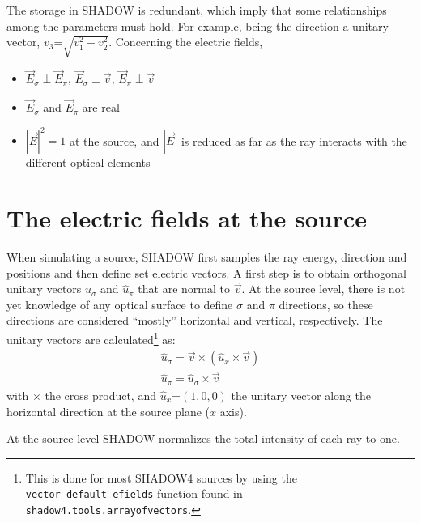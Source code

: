 \documentclass{iucr}
\begin{document}
The storage in SHADOW is redundant, which imply that some relationships among the parameters must hold. For example, being the direction a unitary vector, $v_3\text{=}\sqrt{v_1^2+v_2^2}$. Concerning the electric fields,
\begin{itemize}
 \item $\vec{E}_\sigma \perp \vec{E}_\pi$, $\vec{E}_\sigma \perp \vec{v}$, $\vec{E}_\pi \perp \vec{v}$
 \item $\vec{E}_\sigma$ and $\vec{E}_\pi$ are real
 \item $|\vec{E}|^2=1$ at the source, and $|\vec{E}|$ is reduced as far as the ray interacts with the different 
 optical elements
\end{itemize}

\section{The electric fields at the source}
\label{sec:source}

When simulating a source, SHADOW first samples the ray energy, direction and positions and then define set electric vectors. 
A first step is to obtain orthogonal unitary vectors $\hat{u}_\sigma$ and $\hat{u}_\pi$ that are normal to $\vec{v}$.
At the source level, there is not yet knowledge of any optical surface to define $\sigma$ and $\pi$ directions, so these directions 
are considered ``mostly'' horizontal and vertical, respectively. The unitary vectors are calculated\footnote{
This is done for most SHADOW4 sources by using the {\tt vector\_default\_efields} function found in {\tt shadow4.tools.arrayofvectors}.
} as: 
\begin{eqnarray}
   \hat{u}_\sigma = \vec{v} \times (\hat{u}_x \times \vec{v}) \nonumber \\
   \hat{u}_\pi = \hat{u}_\sigma \times  \vec{v}
\end{eqnarray}
with $\times$ the cross product, and  $\hat{u}_x\text{=}(1,0,0)$ the unitary vector along the horizontal direction at the source plane ($x$ axis).

At the source level SHADOW normalizes the total intensity of each ray to one.
\end{document}
